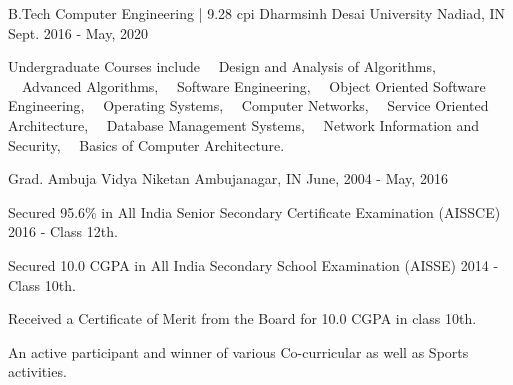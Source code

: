 


\begin{cventries}

\cventry
{B.Tech Computer Engineering | 9.28 cpi} %
{Dharmsinh Desai University} %
{Nadiad, IN} %
{Sept. 2016 - May, 2020} %
{ %
\begin{cvitems}
\item {Undergraduate Courses include ~~Design and Analysis of Algorithms, ~~Advanced Algorithms, ~~Software Engineering, ~~Object Oriented Software Engineering, ~~Operating Systems, ~~Computer Networks, ~~Service Oriented Architecture,  ~~Database Management Systems, ~~Network Information and Security, ~~Basics of Computer Architecture.}
\end{cvitems}
}




\cventry
{Grad.} %
{Ambuja Vidya Niketan} %
{Ambujanagar, IN} %
{June, 2004 - May, 2016} %
{ %
\begin{cvitems}
\item {Secured 95.6\% in All India Senior Secondary Certificate Examination (AISSCE) 2016 - Class 12th.}
\item {Secured 10.0 CGPA in All India Secondary School Examination (AISSE) 2014 - Class 10th.}
\item {Received a Certificate of Merit from the Board for 10.0 CGPA in class 10th.}
\item {An active participant and winner of various Co-curricular as well as Sports activities.}
\end{cvitems}
}

\end{cventries}

